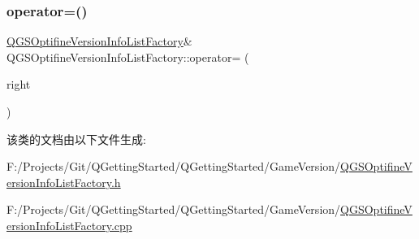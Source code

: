 \mbox{\label{class_q_g_s_optifine_version_info_list_factory_a4b256b135405ee0f68dfa62492e38022}} 
\subsubsection{\texorpdfstring{operator=()}{operator=()}\hspace{0.1cm}{\footnotesize\ttfamily [2/2]}}
{\footnotesize\ttfamily \mbox{\hyperlink{class_q_g_s_optifine_version_info_list_factory}{Q\+G\+S\+Optifine\+Version\+Info\+List\+Factory}}\& Q\+G\+S\+Optifine\+Version\+Info\+List\+Factory\+::operator= (\begin{DoxyParamCaption}\item[{\mbox{\hyperlink{class_q_g_s_optifine_version_info_list_factory}{Q\+G\+S\+Optifine\+Version\+Info\+List\+Factory}} \&\&}]{right }\end{DoxyParamCaption})\hspace{0.3cm}{\ttfamily [delete]}}



该类的文档由以下文件生成\+:\begin{DoxyCompactItemize}
\item 
F\+:/\+Projects/\+Git/\+Q\+Getting\+Started/\+Q\+Getting\+Started/\+Game\+Version/\mbox{\hyperlink{_q_g_s_optifine_version_info_list_factory_8h}{Q\+G\+S\+Optifine\+Version\+Info\+List\+Factory.\+h}}\item 
F\+:/\+Projects/\+Git/\+Q\+Getting\+Started/\+Q\+Getting\+Started/\+Game\+Version/\mbox{\hyperlink{_q_g_s_optifine_version_info_list_factory_8cpp}{Q\+G\+S\+Optifine\+Version\+Info\+List\+Factory.\+cpp}}\end{DoxyCompactItemize}
